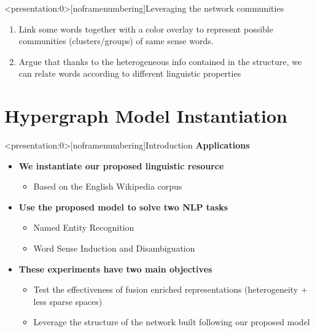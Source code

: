 \documentclass[10pt,=table]{beamer}
\begin{document}
\begin{frame}<presentation:0>[noframenumbering]{Leveraging the network communities} 
\begin{enumerate}
\item Link some words together with a color overlay to represent possible communities (clusters/groups) of same sense words. 
\item Argue that thanks to the heterogeneous info contained in the structure, we can relate words according to different linguistic properties 

\end{enumerate}
\end{frame}

\section[Applications to NLP]{Hypergraph Model Instantiation}



\begin{frame}<presentation:0>[noframenumbering]{Introduction}
\large \textbf{Applications}
\vspace{.5cm}
\begin{itemize}
\item \large \textbf{We instantiate our proposed linguistic resource}
\begin{itemize}
\item Based on the English Wikipedia corpus
\end{itemize}
\item \large \textbf{Use the proposed model  to solve two NLP tasks}
	\begin{itemize}
	\item Named Entity Recognition 
	\item Word Sense Induction and Disambiguation
	\end{itemize}
\vspace{.3cm}
\item \large \textbf{These experiments have two main objectives}
	\begin{itemize}
	\item Test the effectiveness of fusion enriched representations (heterogeneity + less sparse spaces)
	\item Leverage the structure of the network built following our proposed model
	\end{itemize}

\end{itemize}
\vspace{\textheight}
\end{frame}
\end{document}
